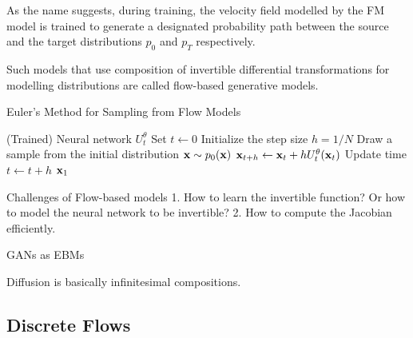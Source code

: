 \documentclass[a4paper, 11pt]{article}
\begin{document}
As the name suggests, during training, the velocity field modelled by the FM model is trained to generate a designated probability path between the source and the target distributions $p_0$ and $p_T$ respectively.


Such models that use composition of invertible differential transformations for modelling distributions are called flow-based generative models.


\begin{algorithm}
    \caption{Euler's Method for Sampling from Flow Models}\label{alg:fm_sample}
    \begin{algorithmic}[1]
    \Require (Trained) Neural network $U_t^{\theta}$
    \State Set $t \gets 0$
    \State Initialize the step size $h = 1 / N$
    \State Draw a sample from the initial distribution $\mbox{$\mbox{$\mathbf{x}$}$} \sim p_0(\mbox{$\mbox{$\mathbf{x}$}$})$
    \State $\mbox{$\mbox{$\mathbf{x}$}$}_{t+h} \gets \mbox{$\mbox{$\mathbf{x}$}$}_t + h U_t^{\theta}(\mbox{$\mbox{$\mathbf{x}$}$}_t)$
    \State Update time $t \gets t + h$
    \EndFor
    \State \Return $\mbox{$\mbox{$\mathbf{x}$}$}_1$
    \end{algorithmic}
\end{algorithm}


Challenges of Flow-based models 1. How to learn the invertible function? Or how to model the neural network to be invertible? 2. How to compute the Jacobian efficiently.


GANs as EBMs

\begin{center} 
\end{center} 


Diffusion is basically infinitesimal compositions.

\subsection{Discrete Flows}
\end{document}
